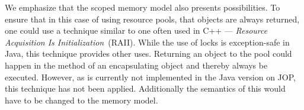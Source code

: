 We emphasize that the scoped memory model also presents possibilities. To ensure that in this case of using resource pools, that objects are always returned, one could use a technique similar to one often used in C++ --- \textit{Resource Acquisition Is Initialization}~(RAII)\cite{RAII}. While the use of locks is exception-safe in Java, this technique provides other uses. Returning an object to the pool could happen in the  method of an encapsulating object and thereby always be executed. However, as  is currently not implemented in the Java version on JOP, this technique has not been applied. Additionally the semantics of this would have to be changed to the memory model.

